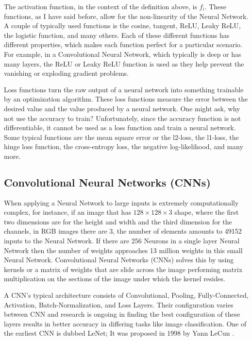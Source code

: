 The activation function, in the context of the definition above, is $f_i$. These functions, as I have said before, allow for the non-linearity of the Neural Network. A couple of typically used functions is the cosine, tangent, ReLU, Leaky ReLU, the logistic function, and many others. Each of these different functions has different properties, which makes each function perfect for a particular scenario. For example, in a Convolutional Neural Network, which typically is deep or has many layers, the ReLU or Leaky ReLU function is used as they help prevent the vanishing or exploding gradient problems.

Loss functions turn the raw output of a neural network into something trainable by an optimization algorithm. These loss functions measure the error between the desired value and the value produced by a neural network. One might ask, why not use the accuracy to train? Unfortunately, since the accuracy function is not differentiable, it cannot be used as a loss function and train a neural network. Some typical functions are the mean square error or the l2-loss, the l1-loss, the hinge loss function, the cross-entropy loss, the negative log-likelihood, and many more.

\subsection{Convolutional Neural Networks (CNNs)}

When applying a Neural Network to large inputs is extremely computationally complex, for instance, if an image that has $128\times 128\times 3$ shape, where the first two dimensions are for the height and width and the third dimension for the channels, in RGB images there are 3, the number of elements amounts to 49152 inputs to the Neural Network. If there are 256 Neurons in a single layer Neural Network then the number of weights approaches 13 million weights in this small Neural Network. Convolutional Neural Networks (CNNs) solves this by using kernels or a matrix of weights that are slide across the image performing matrix multiplication on the sections of the image under which the kernel resides.

A CNN's typical architecture consists of Convolutional, Pooling, Fully-Connected, Activation, Batch-Normalization, and Loss Layers. Their configuration varies between CNN and research is ongoing in finding the best configuration of these layers results in better accuracy in differing tasks like image classification. One of the earliest CNN is dubbed LeNet; It was proposed in 1998 by Yann LeCun \cite{lecun1998gradient}. 

